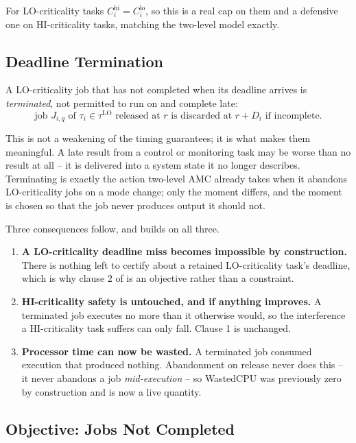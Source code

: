 \documentclass{article}
\begin{document}
For LO-criticality tasks $C_i^{\mathrm{hi}} = C_i^{\mathrm{lo}}$, so this is a
real cap on them and a defensive one on HI-criticality tasks, matching the
two-level model exactly.

\subsection{Deadline Termination}
\label{sec:termination}

A LO-criticality job that has not completed when its deadline arrives is
\emph{terminated}, not permitted to run on and complete late:
\[
\text{job } J_{i,q} \text{ of } \tau_i \in \tau^{\mathrm{LO}}
\text{ released at } r \text{ is discarded at } r + D_i \text{ if incomplete.}
\]

This is not a weakening of the timing guarantees; it is what makes them
meaningful. A late result from a control or monitoring task may be worse than
no result at all -- it is delivered into a system state it no longer describes.
Terminating is exactly the action two-level AMC already takes when it abandons
LO-criticality jobs on a mode change; only the moment differs, and the moment
is chosen so that the job never produces output it should not.

Three consequences follow, and  builds on all three.
\begin{enumerate}
\item \textbf{A LO-criticality deadline miss becomes impossible by
  construction.} There is nothing left to certify about a retained
  LO-criticality task's deadline, which is why clause 2 of
   is an objective rather than a constraint.
\item \textbf{HI-criticality safety is untouched, and if anything improves.} A
  terminated job executes no more than it otherwise would, so the interference
  a HI-criticality task suffers can only fall. Clause 1 is unchanged.
\item \textbf{Processor time can now be wasted.} A terminated job consumed
  execution that produced nothing. Abandonment on release never does this --
  it never abandons a job \emph{mid-execution} -- so WastedCPU was previously
  zero by construction and is now a live quantity.
\end{enumerate}

\subsection{Objective: Jobs Not Completed}
\label{sec:objective}
\end{document}
